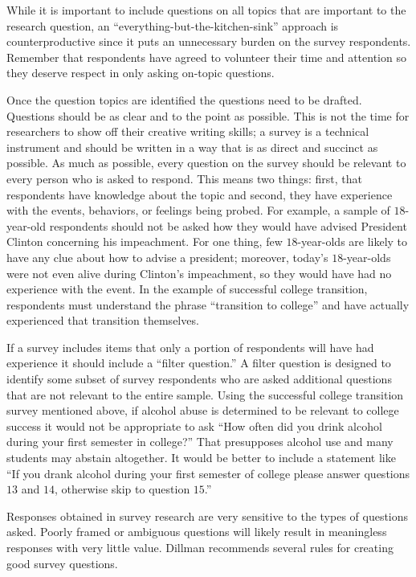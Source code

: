 While it is important to include questions on all topics that are important to the research question, an ``everything-but-the-kitchen-sink'' approach is counterproductive since it puts an unnecessary burden on the survey respondents. Remember that respondents have agreed to volunteer their time and attention so they deserve respect in only asking on-topic questions.

Once the question topics are identified the questions need to be drafted. Questions should be as clear and to the point as possible. This is not the time for researchers to show off their creative writing skills; a survey is a technical instrument and should be written in a way that is as direct and succinct as possible. As much as possible, every question on the survey should be relevant to every person who is asked to respond. This means two things: first, that respondents have knowledge about the topic and second, they have experience with the events, behaviors, or feelings being probed. For example, a sample of $ 18 $-year-old respondents should not be asked how they would have advised President Clinton concerning his impeachment. For one thing, few $ 18 $-year-olds are likely to have any clue about how to advise a president; moreover, today's $ 18 $-year-olds were not even alive during Clinton's impeachment, so they would have had no experience with the event. In the example of successful college transition, respondents must understand the phrase ``transition to college'' and have actually experienced that transition themselves.

If a survey includes items that only a portion of respondents will have had experience it should include a ``filter question.'' A filter question is designed to identify some subset of survey respondents who are asked additional questions that are not relevant to the entire sample. Using the successful college transition survey mentioned above, if alcohol abuse is determined to be relevant to college success it would not be appropriate to ask ``How often did you drink alcohol during your first semester in college?'' That presupposes alcohol use and many students may abstain altogether. It would be better to include a statement like ``If you drank alcohol during your first semester of college please answer questions $ 13 $ and $ 14 $, otherwise skip to question $ 15 $.''

Responses obtained in survey research are very sensitive to the types of questions asked. Poorly framed or ambiguous questions will likely result in meaningless responses with very little value. Dillman\cite{dillman2011mail} recommends several rules for creating good survey questions.

